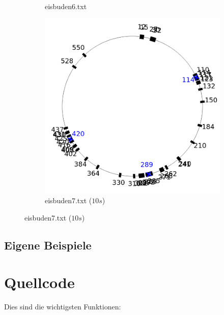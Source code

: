 \documentclass[a4paper,10pt,ngerman,captions=figureheading]{scrartcl}
\newcommand{\imageWidth}{0.3\linewidth}
\begin{document}
\begin{figure}[ht]
\begin{subfigure}[t]{\imageWidth}
        \caption{eisbuden6.txt}
        \label{fig:eisbuden6}
    \end{subfigure}
    \begin{subfigure}[t]{\imageWidth}
        \includegraphics[width=\linewidth]{eisbuden7.png}
        \caption{eisbuden7.txt ($10s$)}
        \label{fig:eisbuden7}
    \end{subfigure}
\end{figure}

\subsection{Eigene Beispiele}

\section{Quellcode}
Dies sind die wichtigsten Funktionen:
\begin{lstlisting}
\end{lstlisting}
\end{document}
